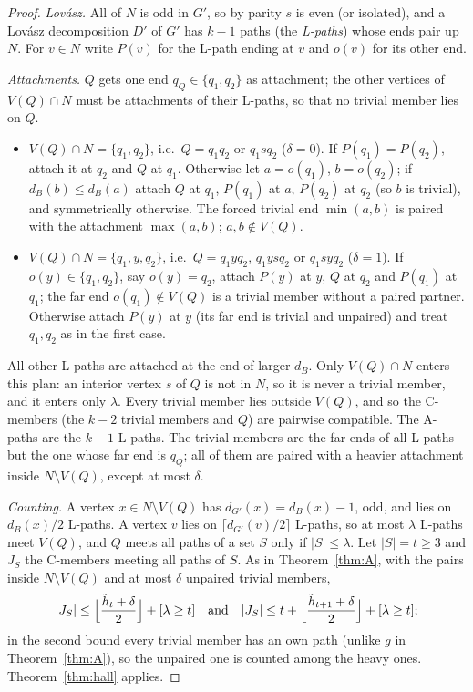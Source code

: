 \documentclass[11pt]{amsart}
\theoremstyle{definition}
\begin{document}
\begin{proof}
\emph{Lov\'asz.} All of $N$ is odd in $G'$, so by parity $s$ is even (or isolated), and a Lov\'asz
decomposition $D'$ of $G'$ has $k-1$ paths (the \emph{L-paths}) whose ends pair up $N$. For $v\in N$
write $P(v)$ for the L-path ending at $v$ and $o(v)$ for its other end.

\emph{Attachments.} $Q$ gets one end $q_Q\in\{q_1,q_2\}$ as attachment; the other vertices of
$V(Q)\cap N$ must be attachments of their L-paths, so that no trivial member lies on $Q$.
\begin{itemize}[leftmargin=*]
\item $V(Q)\cap N=\{q_1,q_2\}$, i.e.\ $Q=q_1q_2$ or $q_1sq_2$ ($\delta=0$). If $P(q_1)=P(q_2)$, attach it at $q_2$ and $Q$ at
$q_1$. Otherwise let $a=o(q_1)$, $b=o(q_2)$; if $d_B(b)\le d_B(a)$ attach $Q$ at $q_1$, $P(q_1)$ at
$a$, $P(q_2)$ at $q_2$ (so $b$ is trivial), and symmetrically otherwise. The forced trivial end
$\min(a,b)$ is paired with the attachment $\max(a,b)$; $a,b\notin V(Q)$.
\item $V(Q)\cap N=\{q_1,y,q_2\}$, i.e.\ $Q=q_1yq_2$, $q_1ysq_2$ or $q_1syq_2$ ($\delta=1$). If $o(y)\in\{q_1,q_2\}$, say $o(y)=q_2$, attach $P(y)$
at $y$, $Q$ at $q_2$ and $P(q_1)$ at $q_1$; the far end $o(q_1)\notin V(Q)$ is a trivial member
without a paired partner. Otherwise attach $P(y)$ at $y$ (its far end is trivial and unpaired) and
treat $q_1,q_2$ as in the first case.
\end{itemize}
All other L-paths are attached at the end of larger $d_B$. Only $V(Q)\cap N$ enters this plan: an
interior vertex $s$ of $Q$ is not in $N$, so it is never a trivial member, and it enters only $\lambda$. Every trivial member lies outside $V(Q)$,
and so the C-members (the $k-2$ trivial members and $Q$) are pairwise compatible. The A-paths are the
$k-1$ L-paths. The trivial members are the far ends of all L-paths but the one whose far end is $q_Q$;
all of them are paired with a heavier attachment inside $N\setminus V(Q)$, except at most $\delta$.

\emph{Counting.} A vertex $x\in N\setminus V(Q)$ has $d_{G'}(x)=d_B(x)-1$, odd, and lies on
$d_B(x)/2$ L-paths. A vertex $v$ lies on $\lceil d_{G'}(v)/2\rceil$ L-paths, so at most $\lambda$
L-paths meet $V(Q)$, and $Q$ meets all paths of a set $S$ only if $|S|\le\lambda$. Let $|S|=t\ge3$ and
$J_S$ the C-members meeting all paths of $S$. As in Theorem~\ref{thm:A}, with the pairs inside
$N\setminus V(Q)$ and at most $\delta$ unpaired trivial members,
\[
|J_S|\le\Bigl\lfloor\frac{\tilde h_t+\delta}{2}\Bigr\rfloor+[\lambda\ge t]
\quad\text{and}\quad
|J_S|\le t+\Bigl\lfloor\frac{\tilde h_{t+1}+\delta}{2}\Bigr\rfloor+[\lambda\ge t];
\]
in the second bound every trivial member has an own path (unlike $g$ in Theorem~\ref{thm:A}), so the
unpaired one is counted among the heavy ones. Theorem~\ref{thm:hall} applies.
\end{proof}
\end{document}
